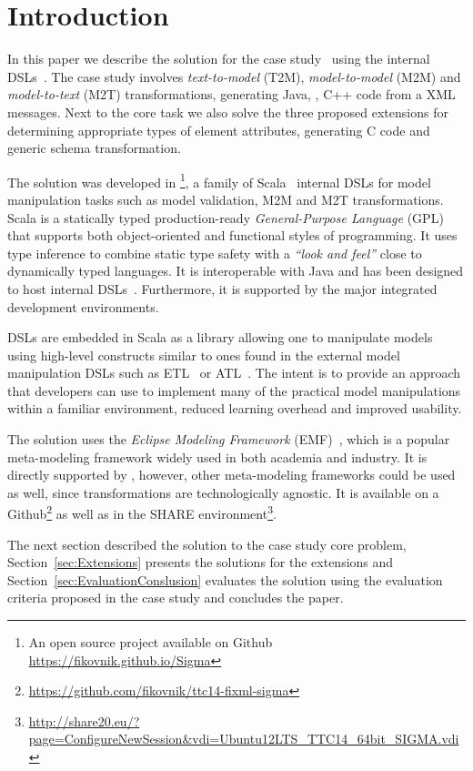 
\enlargethispage{20mm}

\section{Introduction}
\label{sec:Introduction}

In this paper we describe the solution for the \TTC \FIXML case study~\cite{Lano2014} using the \SIGMA internal DSLs~\cite{Krikava2014}.
The case study involves \emph{text-to-model} (T2M), \emph{model-to-model} (M2M) and \emph{model-to-text} (M2T) transformations, generating Java, \Csharp, C++ code from a \FIXML XML messages.
Next to the core task we also solve the three proposed extensions for determining appropriate types of element attributes, generating C code and generic \FIXML schema transformation.

The solution was developed in \SIGMA\footnote{An open source project available on Github \url{https://fikovnik.github.io/Sigma}}, a family of Scala~\cite{Odersky2004} internal DSLs for model manipulation tasks such as model validation, M2M and M2T transformations.
Scala is a statically typed production-ready \emph{General-Purpose Language} (GPL) that supports both object-oriented and functional styles of programming.
It uses type inference to combine static type safety with a \emph{``look and feel''} close to dynamically typed languages.
It is interoperable with Java and has been designed to host internal DSLs~\cite{Chafi2010}.
Furthermore, it is supported by the major integrated development environments.

\SIGMA DSLs are embedded in Scala as a library allowing one to manipulate models using high-level constructs similar to ones found in the external model manipulation DSLs such as ETL~\cite{Kolovos2008a} or ATL~\cite{Jouault2006}.
The intent is to provide an approach that developers can use to implement many of the practical model manipulations within a familiar environment, reduced learning overhead and improved usability.

The solution uses the \emph{Eclipse Modeling Framework} (EMF)~\cite{EMF}, which is a popular meta-modeling framework widely used in both academia and industry.
It is directly supported by \SIGMA, however, other meta-modeling frameworks could be used as well, since \SIGMA transformations are technologically agnostic.
It is available on a Github\footnote{\url{https://github.com/fikovnik/ttc14-fixml-sigma}} as well as in the SHARE environment\footnote{\url{http://share20.eu/?page=ConfigureNewSession&vdi=Ubuntu12LTS_TTC14_64bit_SIGMA.vdi}}.

The next section described the solution to the case study core problem, Section~\ref{sec:Extensions} presents the solutions for the extensions and Section~\ref{sec:EvaluationConslusion} evaluates the solution using the evaluation criteria proposed in the case study and concludes the paper.